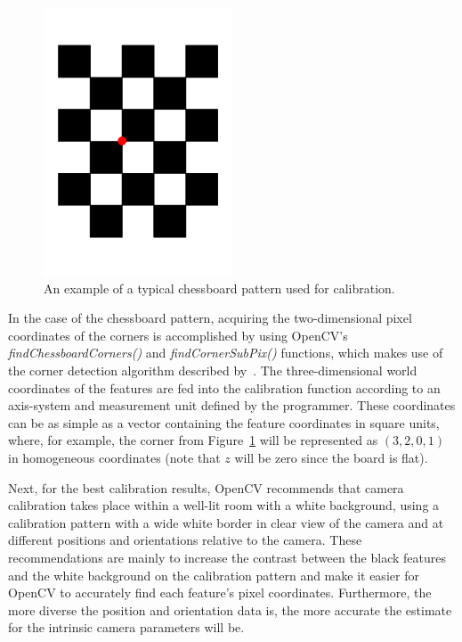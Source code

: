 \begin{figure}
  \centering
  \includegraphics[angle=90, width=0.5\textwidth]{figures/chapter2/chessboard_pattern}
  \caption{An example of a typical chessboard pattern used for calibration.}
\label{fig:chap2-calib-pattern}
\end{figure}

In the case of the chessboard pattern, acquiring the two-dimensional pixel coordinates of the corners is accomplished by using OpenCV's \emph{findChessboardCorners()} and \emph{findCornerSubPix()} functions, which makes use of the corner detection algorithm described by~\cite{harris1988combined}. The three-dimensional world coordinates of the features are fed into the calibration function according to an axis-system and measurement unit defined by the programmer. These coordinates can be as simple as a vector containing the feature coordinates in square units, where, for example, the corner from Figure~\ref{fig:chap2-calib-pattern} will be represented as $(3, 2, 0, 1)$ in homogeneous coordinates (note that $z$ will be zero since the board is flat). 

Next, for the best calibration results, OpenCV recommends that camera calibration takes place within a well-lit room with a white background, using a calibration pattern with a wide white border in clear view of the camera and at different positions and orientations relative to the camera. These recommendations are mainly to increase the contrast between the black features and the white background on the calibration pattern and make it easier for OpenCV to accurately find each feature's pixel coordinates. Furthermore, the more diverse the position and orientation data is, the more accurate the estimate for the intrinsic camera parameters will be. 

